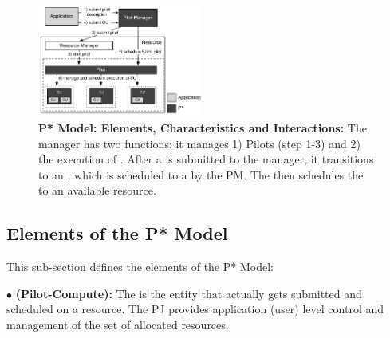 \documentclass[conference]{IEEEtran}
\begin{document}


\begin{figure}[t]
    \centering
    \includegraphics[width=0.48\textwidth]{../figures/pstar_model_single.pdf}
    \caption{ \textbf{P* Model: Elements, Characteristics and
        Interactions:} The manager has two functions: it manages 1)
      Pilots (step 1-3) and 2) the execution of \cus. After a \cu is
      submitted to the manager, it transitions to an \su, which is
      scheduled to a \pilot by the PM. The \pilot then schedules the
      \su to an available resource.  }
    \label{fig:figures_pstar}
\end{figure}




%

\noindent 
\subsection{Elements of the P* Model}


\noindent This sub-section defines the elements of the P* Model:


\noindent$\bullet$ \textbf{\pilot (Pilot-Compute):} The \pilot is the
  entity that actually gets submitted and scheduled on a resource.
  The PJ provides application (user)
  level control and management of the set of allocated resources.

\end{document}
